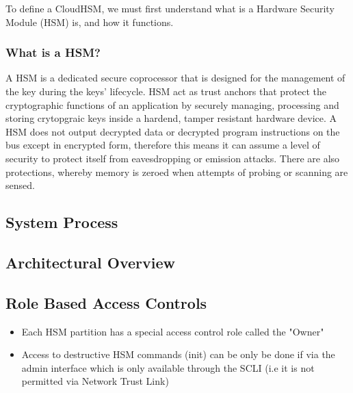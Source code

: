 		To define a CloudHSM, we must first understand what is a Hardware Security Module (HSM) is, and how it functions. \\

		\subsubsection{What is a HSM?}

		A HSM is  a dedicated secure coprocessor that is designed for the management of the key during the keys' lifecycle. HSM act as trust anchors that protect the cryptographic functions of an application by securely managing, processing and storing crytopgraic keys inside a hardend, tamper resistant hardware device. A HSM does not output decrypted data or decrypted program instructions on the bus except in encrypted form, therefore this means it can assume a level of security to protect itself from eavesdropping or emission attacks. There are also protections, whereby memory is zeroed when attempts of probing or scanning are sensed. 

		\paragraph{}



		\subsection{System Process}

			\subsection{Architectural Overview}

			\subsection{Role Based Access Controls}
			
			\begin{itemize}
			
				\item Each HSM partition has a special access control role called the {"Owner"}
				
				\item Access to destructive HSM commands (init) can be only be done if via the admin interface which is only available through the SCLI (i.e it is not permitted via Network Trust Link)
			\end{itemize}

